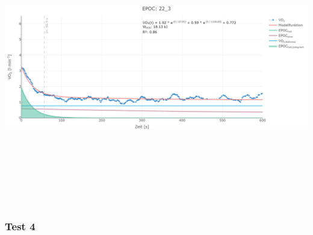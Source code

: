 \documentclass[
  letterpaper,
  DIV=11]{scrartcl}
\begin{document}
\includegraphics[width=11.45833in,height=4.6875in]{images/22_3.png}

\subsubsection{Test 4}
\end{document}
